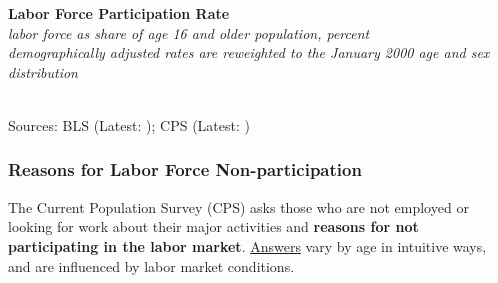 \documentclass{report}
\makeatletter
\newcommand{\tbllink}[1]{\href{https://raw.githubusercontent.com/bdecon/US-chartbook/master/chartbook/data/#1}{\faTable}}
\newcommand*\short[1]{\expandafter\@gobbletwo\number\numexpr#1\relax}
\newcommand{\absnode}[3]{\node[below right, align=left] at (axis cs: #1,#2) {#3};}
\newcommand{\dateaxisticks}{
		date coordinates in=x, axis line style={draw=none},
		xmax={2022-03-15},
		max space between ticks=40,	    
		xtick={{1990-01-01}, {1992-01-01}, {1994-01-01}, 
			{1996-01-01}, {1998-01-01}, {2000-01-01}, 
			{2002-01-01}, {2004-01-01}, {2006-01-01},
			{2008-01-01}, {2010-01-01}, {2012-01-01}, {2014-01-01},
		    {2016-01-01}, {2018-01-01}, {2020-01-01}, {2022-01-01}, 
		    {2024-01-01}, {2026-01-01}},
		minor xtick={{1989-01-01}, {1991-01-01}, {1993-01-01},
			{1995-01-01}, {1997-01-01}, {1999-01-01}, 
			{2001-01-01}, {2003-01-01}, {2005-01-01}, {2007-01-01},
		    {2009-01-01}, {2011-01-01}, {2013-01-01}, {2015-01-01},
		    {2017-01-01}, {2019-01-01}, {2021-01-01}, {2023-01-01}, 
		    {2025-01-01}, {2027-01-01}},
		enlarge y limits={0.06}, enlarge x limits={0.01},
		}
\newcommand{\bbar}[2]{extra #1 ticks = {{#2}}, extra #1 tick labels = ,
		extra #1 tick style = {grid=major, grid style={thick, black!25}},}
\newcommand{\stdline}[4]{\addplot[very thick, no markers, color=#1] 
		table [x=#2, y=#3, col sep=comma] {#4};	}
\newcommand{\rbars}{
		\fill[color=black!10] (axis cs:{1990-07-01},\pgfkeysvalueof{/pgfplots/ymin}) rectangle 
			(axis cs:{1991-03-01}, \pgfkeysvalueof{/pgfplots/ymax});
		\fill[color=black!10] (axis cs:{2007-12-01},\pgfkeysvalueof{/pgfplots/ymin}) rectangle 
			(axis cs:{2009-07-01}, \pgfkeysvalueof{/pgfplots/ymax});
		\fill[color=black!10] (axis cs:{2001-03-01},\pgfkeysvalueof{/pgfplots/ymin}) rectangle 
			(axis cs:{2001-11-01}, \pgfkeysvalueof{/pgfplots/ymax});
		\fill[color=black!10] (axis cs:{2020-02-01},\pgfkeysvalueof{/pgfplots/ymin}) rectangle 
			(axis cs:{2020-05-01}, \pgfkeysvalueof{/pgfplots/ymax});}
\makeatother
\begin{document}
{{\begin{minipage}{0.76\textwidth}
\normalsize \textbf{Labor Force Participation Rate}\\
\footnotesize{\textit{labor force as share of age 16 and older population, percent\\demographically adjusted rates are reweighted to the January 2000 age and sex distribution}}\\
\hspace*{-2mm} \\
\footnotesize{Sources: BLS (Latest: \unskip); CPS (Latest: \unskip)} \hfill \tbllink{lfpr.csv}
\end{minipage}
\newpage
\begin{minipage}{0.76\textwidth}
\subsubsection*{Reasons for Labor Force Non-participation}
\vspace{-0.5mm}

\small The Current Population Survey (CPS) asks those who are not employed or looking for work about their major activities and \textbf{reasons for not participating in the labor market}. \href{https://www.frbatlanta.org/chcs/human-capital-currents/2015/0612-measuring-labor-market-status-using-basic-data.aspx}{Answers} vary by age in intuitive ways, and are influenced by labor market conditions. 
\end{minipage}

}}
\end{document}
